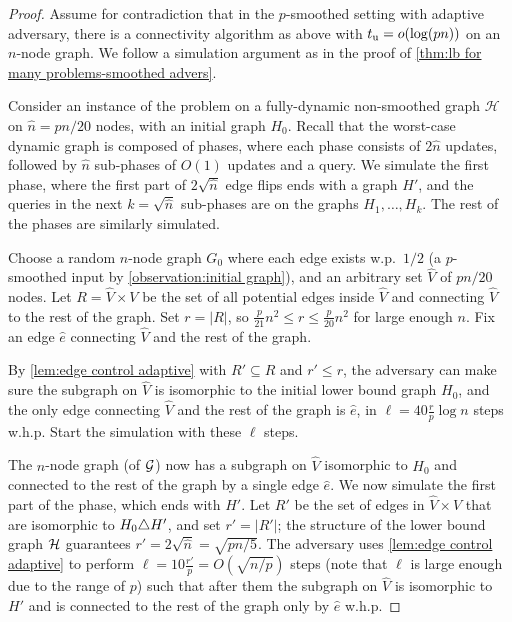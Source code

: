 \documentclass[letter,11pt]{article}
\newcommand{\tu}{t_{\textnormal{u}}}
\begin{document}
\begin{proof}
	Assume for contradiction that in the $p$-smoothed setting with adaptive adversary, there is a connectivity algorithm as above with $\tu=o(\log(pn))$ on an $n$-node graph.
	We follow a simulation argument as in the proof of \cref{thm:lb for many problems-smoothed advers}.
	
	Consider an instance of the problem on a fully-dynamic non-smoothed graph $\mathcal{H}$ on $\hat n =pn/20$ nodes, with an initial graph $H_0$.
	Recall that the worst-case dynamic graph is composed of phases, 
	where each phase consists of $2\hat n$ updates,
	followed by $\hat n$
	sub-phases of $O(1)$ updates and a query.
	We simulate the first phase,
	where the first part of $2\sqrt{\hat n}$ edge flips ends with a graph $H'$, and 
	the queries in the next $k=\sqrt{\hat n}$ sub-phases are on the graphs $H_1,\ldots,H_k$.
	The rest of the phases are similarly simulated.
	
	Choose a random $n$-node graph $G_0$ where each edge exists w.p.~$1/2$ (a $p$-smoothed input by \cref{observation:initial graph}),
	and an arbitrary set $\hat V$ of $pn/20$ nodes.
	Let $R=\hat V\times V$ be the set of all potential edges inside $\hat V$ and connecting $\hat V$ to the rest of the graph.
	Set $r=|R|$, so $\frac{p}{21}n^2\leq r\leq\frac{p}{20}n^2$ for large enough $n$.
	Fix an edge $\hat e$ connecting $\hat V$ and the rest of the graph.
	
	By \cref{lem:edge control adaptive} with $R'\subseteq R$ and $r'\leq r$,
	the adversary can make sure the subgraph on $\hat V$ is isomorphic to the initial lower bound graph $H_0$,
	and the only edge connecting $\hat V$
	and the rest of the graph is $\hat e$,
	in
	$\ell=40 \frac{r}{p}\log n$
	steps w.h.p. 
	Start the simulation with these $\ell$ steps.
	
	The $n$-node graph (of $\cal G$) now has a subgraph on $\hat V$  isomorphic to $H_0$ and connected to the rest of the graph by a single edge $\hat e$.
	We now simulate the first part of the phase, which ends with $H'$.
	Let $R'$ be the set of edges in $\hat V\times \hat V$ that are isomorphic to $H_0\triangle H'$, and set $r'=|R'|$;
	the structure of the lower bound graph $\cal H$ guarantees 
	$r'=2\sqrt{\hat n}=\sqrt{pn/5}$.
	The adversary uses \cref{lem:edge control adaptive} 
	to perform
	$\ell=10 \frac{r'}{p}=O(\sqrt{n/p})$ steps (note that $\ell$ is large enough due to the range of $p$)
	such that after them the subgraph on $\hat V$ is isomorphic to $H'$ and is connected to the rest of the graph only by $\hat e$ w.h.p.
	

\end{proof}
\end{document}
